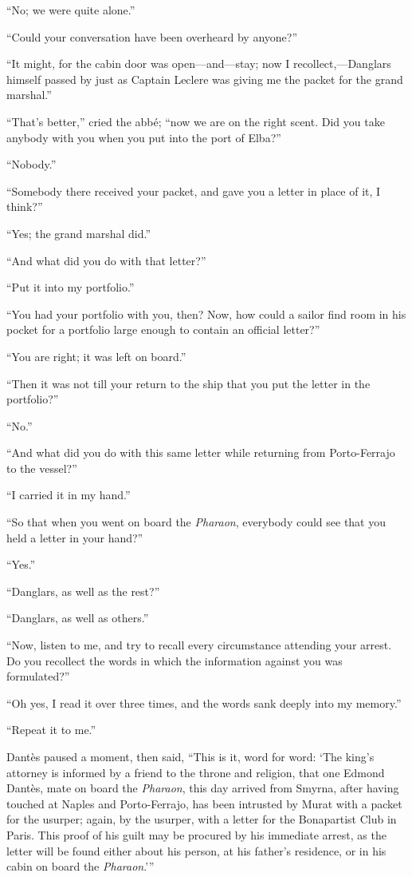 “No; we were quite alone.”

“Could your conversation have been overheard by anyone?”

“It might, for the cabin door was open—and—stay; now I
recollect,—Danglars himself passed by just as Captain Leclere was
giving me the packet for the grand marshal.”

“That’s better,” cried the abbé; “now we are on the right scent. Did
you take anybody with you when you put into the port of Elba?”

“Nobody.”

“Somebody there received your packet, and gave you a letter in place of
it, I think?”

“Yes; the grand marshal did.”

“And what did you do with that letter?”

“Put it into my portfolio.”

“You had your portfolio with you, then? Now, how could a sailor find
room in his pocket for a portfolio large enough to contain an official
letter?”

“You are right; it was left on board.”

“Then it was not till your return to the ship that you put the letter
in the portfolio?”

“No.”

“And what did you do with this same letter while returning from
Porto-Ferrajo to the vessel?”

“I carried it in my hand.”

“So that when you went on board the \textit{Pharaon}, everybody could see that
you held a letter in your hand?”

“Yes.”

“Danglars, as well as the rest?”

“Danglars, as well as others.”

“Now, listen to me, and try to recall every circumstance attending your
arrest. Do you recollect the words in which the information against you
was formulated?”

“Oh yes, I read it over three times, and the words sank deeply into my
memory.”

“Repeat it to me.”

Dantès paused a moment, then said, “This is it, word for word: ‘The
king’s attorney is informed by a friend to the throne and religion,
that one Edmond Dantès, mate on board the \textit{Pharaon}, this day arrived
from Smyrna, after having touched at Naples and Porto-Ferrajo, has been
intrusted by Murat with a packet for the usurper; again, by the
usurper, with a letter for the Bonapartist Club in Paris. This proof of
his guilt may be procured by his immediate arrest, as the letter will
be found either about his person, at his father’s residence, or in his
cabin on board the \textit{Pharaon}.’”

